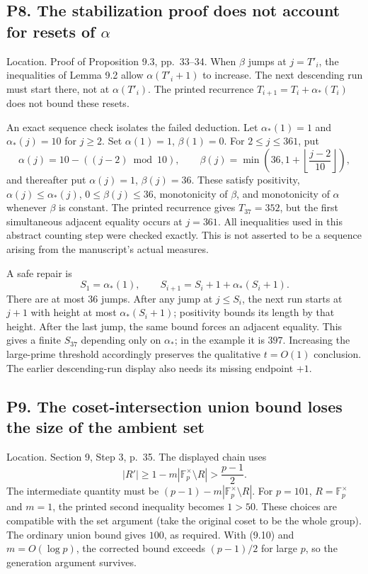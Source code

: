 \documentclass[10pt]{article}
\begin{document}
\subsection*{P8. The stabilization proof does not account for resets of \(\alpha\)}
Location. Proof of Proposition 9.3, pp. 33–34. When \(\beta\) jumps at \(j=T'_i\), the inequalities of Lemma 9.2 allow \(\alpha(T'_i+1)\) to increase. The next descending run must start there, not at \(\alpha(T'_i)\). The printed recurrence \(T_{i+1}=T_i+\alpha_*(T_i)\) does not bound these resets.\par
An exact sequence check isolates the failed deduction. Let \(\alpha_*(1)=1\) and \(\alpha_*(j)=10\) for \(j\ge2\). Set \(\alpha(1)=1\), \(\beta(1)=0\). For \(2\le j\le361\), put \[\alpha(j)=10-((j-2)\bmod10),\qquad
 \beta(j)=\min\left(36,1+\left\lfloor\frac{j-2}{10}\right\rfloor\right),\] and thereafter put \(\alpha(j)=1\), \(\beta(j)=36\). These satisfy positivity, \(\alpha(j)\le\alpha_*(j)\), \(0\le\beta(j)\le36\), monotonicity of \(\beta\), and monotonicity of \(\alpha\) whenever \(\beta\) is constant. The printed recurrence gives \(T_{37}=352\), but the first simultaneous adjacent equality occurs at \(j=361\). All inequalities used in this abstract counting step were checked exactly. This is not asserted to be a sequence arising from the manuscript’s actual measures.\par
A safe repair is \[S_1=\alpha_*(1),\qquad
 S_{i+1}=S_i+1+\alpha_*(S_i+1).\] There are at most 36 jumps. After any jump at \(j\le S_i\), the next run starts at \(j+1\) with height at most \(\alpha_*(S_i+1)\); positivity bounds its length by that height. After the last jump, the same bound forces an adjacent equality. This gives a finite \(S_{37}\) depending only on \(\alpha_*\); in the example it is \(397\). Increasing the large-prime threshold accordingly preserves the qualitative \(t=O(1)\) conclusion. The earlier descending-run display also needs its missing endpoint \(+1\).\par
\subsection*{P9. The coset-intersection union bound loses the size of the ambient set}
Location. Section 9, Step 3, p. 35. The displayed chain uses \[|R'|\ge 1-m|\mathbb F_p^\times\setminus R|>\frac{p-1}{2}.\] The intermediate quantity must be \((p-1)-m|\mathbb F_p^\times\setminus R|\). For \(p=101\), \(R=\mathbb F_p^\times\) and \(m=1\), the printed second inequality becomes \(1>50\). These choices are compatible with the set argument (take the original coset to be the whole group). The ordinary union bound gives \(100\), as required. With (9.10) and \(m=O(\log p)\), the corrected bound exceeds \((p-1)/2\) for large \(p\), so the generation argument survives.\par
\end{document}
